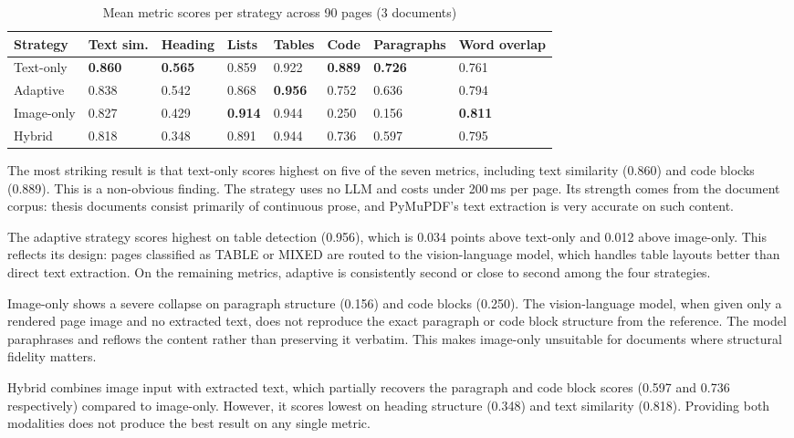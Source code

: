 \documentclass[12pt]{article}
\begin{document}
\begin{table}[h!]
\centering
\caption{Mean metric scores per strategy across 90 pages (3 documents)}
\label{tab:results_overview}
\renewcommand{\arraystretch}{1.4}
\begin{tabularx}{\textwidth}{lXXXXXXX}
\toprule
\textbf{Strategy} & \textbf{Text sim.} & \textbf{Heading} & \textbf{Lists} & \textbf{Tables} & \textbf{Code} & \textbf{Paragraphs} & \textbf{Word overlap} \\
\midrule
Text-only & \textbf{0.860} & \textbf{0.565} & 0.859 & 0.922 & \textbf{0.889} & \textbf{0.726} & 0.761 \\
Adaptive  & 0.838 & 0.542 & 0.868 & \textbf{0.956} & 0.752 & 0.636 & 0.794 \\
Image-only & 0.827 & 0.429 & \textbf{0.914} & 0.944 & 0.250 & 0.156 & \textbf{0.811} \\
Hybrid    & 0.818 & 0.348 & 0.891 & 0.944 & 0.736 & 0.597 & 0.795 \\
\bottomrule
\end{tabularx}
\end{table}

The most striking result is that text-only scores highest on five of the
seven metrics, including text similarity (0.860) and code blocks (0.889).
This is a non-obvious finding. The strategy uses no LLM and costs under
200\,ms per page. Its strength comes from the document corpus: thesis
documents consist primarily of continuous prose, and PyMuPDF's text
extraction is very accurate on such content.

The adaptive strategy scores highest on table detection (0.956), which is
0.034 points above text-only and 0.012 above image-only. This reflects its
design: pages classified as TABLE or MIXED are routed to the vision-language
model, which handles table layouts better than direct text extraction.
On the remaining metrics, adaptive is consistently second or close to
second among the four strategies.

Image-only shows a severe collapse on paragraph structure (0.156) and code
blocks (0.250). The vision-language model, when given only a rendered page
image and no extracted text, does not reproduce the exact paragraph or code
block structure from the reference. The model paraphrases and reflows the
content rather than preserving it verbatim. This makes image-only unsuitable
for documents where structural fidelity matters.

Hybrid combines image input with extracted text, which partially recovers
the paragraph and code block scores (0.597 and 0.736 respectively) compared
to image-only. However, it scores lowest on heading structure (0.348) and
text similarity (0.818). Providing both modalities does not produce the best
result on any single metric.
\end{document}
